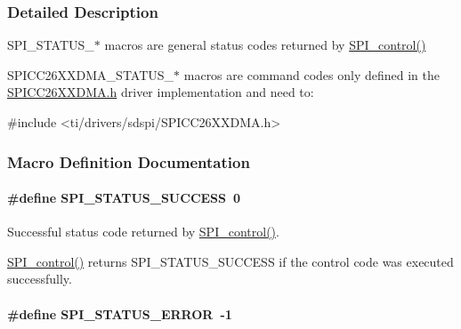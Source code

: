 \subsubsection{Detailed Description}
S\+P\+I\+\_\+\+S\+T\+A\+T\+U\+S\+\_\+$\ast$ macros are general status codes returned by \hyperlink{_s_p_i_8h_ab9d3a23991be2741f382749d3844cc2f}{S\+P\+I\+\_\+control()}

S\+P\+I\+C\+C26\+X\+X\+D\+M\+A\+\_\+\+S\+T\+A\+T\+U\+S\+\_\+$\ast$ macros are command codes only defined in the \hyperlink{_s_p_i_c_c26_x_x_d_m_a_8h}{S\+P\+I\+C\+C26\+X\+X\+D\+M\+A.\+h} driver implementation and need to\+: 
\begin{DoxyCode}
\textcolor{preprocessor}{#include <ti/drivers/sdspi/SPICC26XXDMA.h>}
\end{DoxyCode}
 

\subsubsection{Macro Definition Documentation}
\paragraph[{S\+P\+I\+\_\+\+S\+T\+A\+T\+U\+S\+\_\+\+S\+U\+C\+C\+E\+S\+S}]{\setlength{\rightskip}{0pt plus 5cm}\#define S\+P\+I\+\_\+\+S\+T\+A\+T\+U\+S\+\_\+\+S\+U\+C\+C\+E\+S\+S~0}\label{group___s_p_i___s_t_a_t_u_s_gab38fa90ff62128dbc98b2ecd84ca106f}


Successful status code returned by \hyperlink{_s_p_i_8h_ab9d3a23991be2741f382749d3844cc2f}{S\+P\+I\+\_\+control()}. 

\hyperlink{_s_p_i_8h_ab9d3a23991be2741f382749d3844cc2f}{S\+P\+I\+\_\+control()} returns S\+P\+I\+\_\+\+S\+T\+A\+T\+U\+S\+\_\+\+S\+U\+C\+C\+E\+S\+S if the control code was executed successfully. 
\paragraph[{S\+P\+I\+\_\+\+S\+T\+A\+T\+U\+S\+\_\+\+E\+R\+R\+O\+R}]{\setlength{\rightskip}{0pt plus 5cm}\#define S\+P\+I\+\_\+\+S\+T\+A\+T\+U\+S\+\_\+\+E\+R\+R\+O\+R~-\/1}\label{group___s_p_i___s_t_a_t_u_s_ga2d0020dd673cc28a9e1c20b0ff101073}


